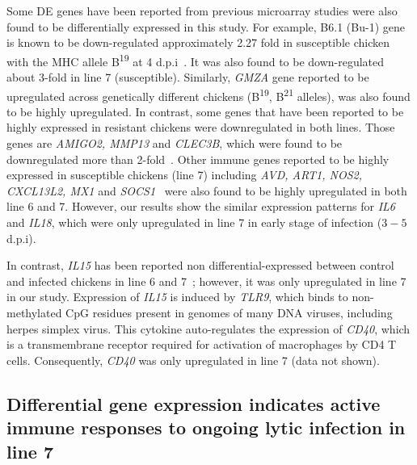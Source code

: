 \documentclass[10pt]{article}
\begin{document}
Some DE genes have been reported from previous microarray studies were also
found to be differentially expressed in this study.  For example, B6.1 (Bu-1)
gene is known to be down-regulated approximately 2.27 fold in susceptible
chicken with the MHC allele B\textsuperscript{19} at 4
d.p.i~\cite{sarson2008transcriptional}.  It was also found to be down-regulated
about 3-fold in line 7 (susceptible).  Similarly, {\em GMZA} gene reported to be
upregulated across genetically different chickens (B\textsuperscript{19},
B\textsuperscript{21} alleles),
was also found to be highly upregulated.  In contrast, some genes that have been
reported to be highly expressed in resistant chickens were downregulated in both
lines. Those genes are {\em AMIGO2, MMP13} and {\em CLEC3B}, which were found to
be downregulated more than 2-fold~\cite{sarson2008transcriptional}.
Other immune genes reported to be highly expressed in susceptible chickens (line
7) including {\em AVD, ART1, NOS2, CXCL13L2, MX1} and {\em
SOCS1}~\cite{smith2011systems} were also found to be highly upregulated in both
line 6 and 7.  However, our results show the similar expression patterns for
{\em IL6} and {\em IL18}, which were only upregulated in line 7 in early stage
of infection ($3-5$ d.p.i).

In contrast, {\em IL15} has been reported non differential-expressed between
control and infected chickens in line 6 and 7~\cite{kaiser2003differential};
however, it was only upregulated in line 7 in our study.  Expression of {\em
IL15} is induced by {\em TLR9}, which binds to non-methylated CpG residues
present in genomes of many DNA viruses, including herpes simplex virus.  This
cytokine auto-regulates the expression of {\em CD40}, which is a transmembrane
receptor required for activation of macrophages by CD4 T cells.  Consequently,
{\em CD40} was only upregulated in line 7 (data not shown).

\subsection*{Differential gene expression indicates active immune responses to
ongoing lytic infection in line 7}
\end{document}
